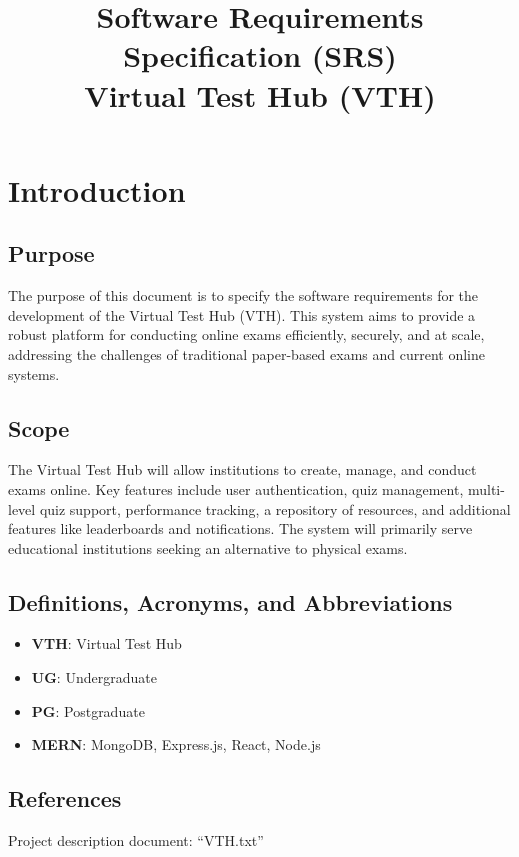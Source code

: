 \documentclass{article}
\title{Software Requirements Specification (SRS)\\ Virtual Test Hub (VTH)}
\author{}
\date{}
\begin{document}
	
	\maketitle
	
	\tableofcontents %
	
	\newpage %
	
	\section{Introduction}
	
	\subsection{Purpose}
	The purpose of this document is to specify the software requirements for the development of the Virtual Test Hub (VTH). This system aims to provide a robust platform for conducting online exams efficiently, securely, and at scale, addressing the challenges of traditional paper-based exams and current online systems.
	
	\subsection{Scope}
	The Virtual Test Hub will allow institutions to create, manage, and conduct exams online. Key features include user authentication, quiz management, multi-level quiz support, performance tracking, a repository of resources, and additional features like leaderboards and notifications. The system will primarily serve educational institutions seeking an alternative to physical exams.
	
	\subsection{Definitions, Acronyms, and Abbreviations}
	\begin{itemize}
		\item \textbf{VTH}: Virtual Test Hub
		\item \textbf{UG}: Undergraduate
		\item \textbf{PG}: Postgraduate
		\item \textbf{MERN}: MongoDB, Express.js, React, Node.js
	\end{itemize}
	
	\subsection{References}
	Project description document: ``VTH.txt''
	
\end{document}
